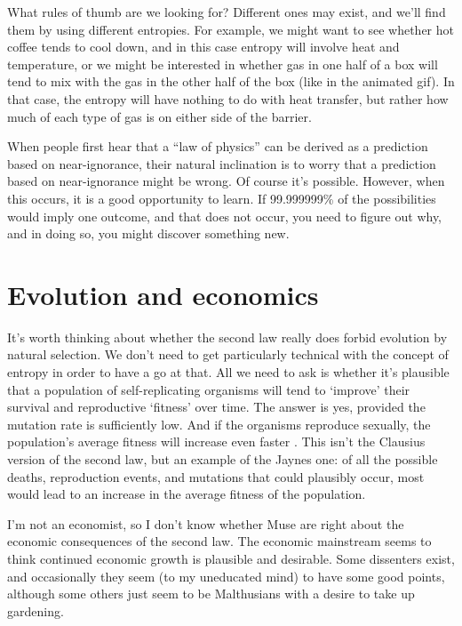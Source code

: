 \documentclass[a4paper, 12pt]{article}
\begin{document}
What rules of thumb are we looking for? Different ones may exist, and
we'll find them by using different entropies. For example, we might want to
see whether hot coffee tends to cool down, and in this case entropy will involve
heat and temperature, or we might be interested in whether gas in one half of
a box will tend to mix with the gas in the other half of the box (like in the
animated gif). In that case, the entropy will have nothing to do with heat
transfer, but rather how much of each type of gas is on either side of the
barrier.

When people first hear that a ``law of physics'' can be derived as
a prediction based on near-ignorance, their natural inclination is to worry
that a prediction based on near-ignorance might be wrong. Of course it's
possible. However, when this occurs, it is a good opportunity to learn.
If 99.999999\% of the possibilities would imply one outcome, and that
does not occur, you need to figure out why, and in doing so, you might
discover something new.

\section*{Evolution and economics}
It's worth thinking about whether the second law really does forbid evolution
by natural selection. We don't need to get particularly technical with the
concept of entropy in order to have a go at that. All we need to ask is whether
it's plausible that a population of self-replicating organisms will tend to
`improve' their survival and reproductive `fitness' over time.
The answer is yes, provided the mutation rate is sufficiently
low. And if the organisms reproduce sexually, the population's average fitness
will increase even faster \citep{mackay}. This isn't the Clausius version of
the second law, but an example of the Jaynes one: of all the possible deaths,
reproduction events, and mutations that could plausibly occur, most would lead to
an increase in the average fitness of the population.

I'm not an economist, so I don't know whether Muse are right about the economic
consequences of the second law. The economic mainstream seems to think
continued economic growth is plausible and desirable. Some dissenters exist,
and occasionally they seem (to my uneducated mind) to have some good points,
although some others just seem to be Malthusians with a desire to
take up gardening.
\end{document}
